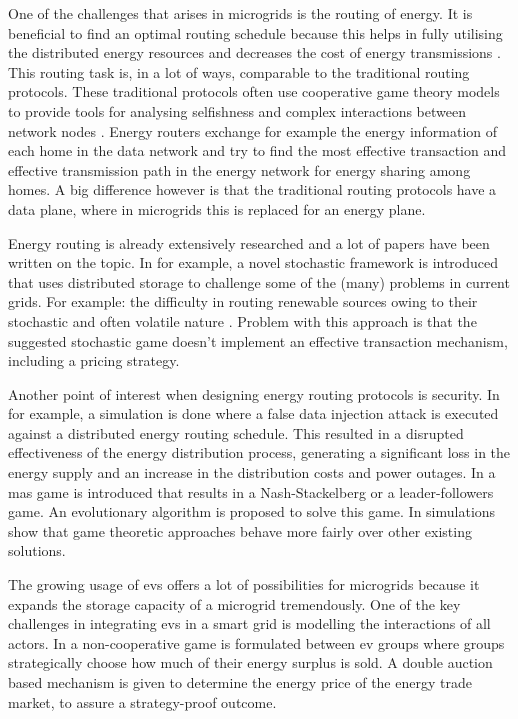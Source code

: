 One of the challenges that arises in microgrids is the routing of energy. It is beneficial to find an optimal routing schedule because this helps in fully utilising the distributed energy resources and decreases the cost of energy transmissions \cite{HongKim2016}. This routing task is, in a lot of ways, comparable to the traditional routing protocols. These traditional protocols often use cooperative game theory models to provide tools for analysing selfishness and complex interactions between network nodes \cite{PavlidouKoltsidas2008}. Energy routers exchange for example the energy information of each home in the data network and try to find the most effective transaction and effective transmission path in the energy network for energy sharing among homes\cite{YoonKimChang2013}. A big difference however is that the traditional routing protocols have a data plane, where in microgrids this is replaced for an energy plane.

Energy routing is already extensively researched and a lot of papers have been written on the topic. In \cite{BaghaieMoellerKrishnamachari2010} for example, a novel stochastic framework is introduced that uses distributed storage to challenge some of the (many) problems in current grids. For example: the difficulty in routing renewable sources owing to their stochastic and often volatile nature \cite{HongKim2016}. Problem with this approach is that the suggested stochastic game doesn't implement an effective transaction mechanism, including a pricing strategy. 

Another point of interest when designing energy routing protocols is security. In \cite{LinYuYangEtAl2012} for example, a simulation is done where a false data injection attack is executed against a distributed energy routing schedule. This resulted in a disrupted effectiveness of the energy distribution process, generating a significant loss in the energy supply and an increase in the distribution costs and power outages. In \cite{AhouraiTabandehJahedEtAl2009} a \ac{mas} game is introduced that results in a Nash-Stackelberg or a leader-followers game. An evolutionary algorithm is proposed to solve this game. In \cite{AhouraiTabandehJahedEtAl2009} simulations show that game theoretic approaches behave more fairly over other existing solutions.

The growing usage of \ac{ev}s offers a lot of possibilities for microgrids because it expands the storage capacity of a microgrid tremendously. One of the key challenges in integrating \ac{ev}s in a smart grid is modelling the interactions of all actors. In \cite{SaadHanPoorEtAl2011} a non-cooperative game is formulated between \ac{ev} groups where groups strategically choose how much of their energy surplus is sold. A double auction based mechanism is given to determine the energy price of the energy trade market, to assure a strategy-proof outcome. 

